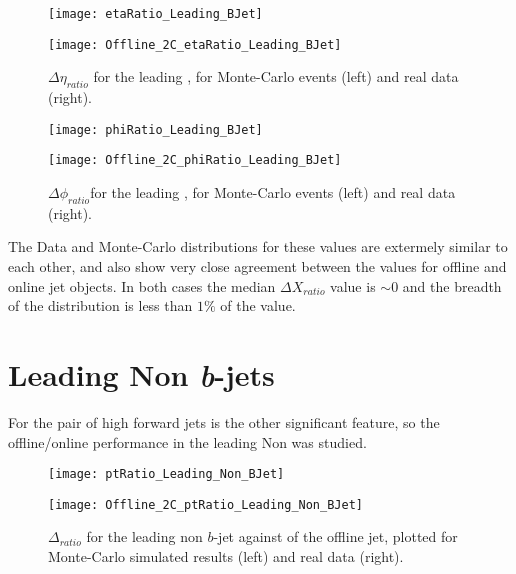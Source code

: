 		\begin{figure}[h]
			\centering
			\begin{minipage}[h]{0.33\linewidth}
				\texttt{[image: etaRatio\_Leading\_BJet]}
				
			\end{minipage}
			\quad
			\begin{minipage}[h]{0.33\linewidth}
				\texttt{[image: Offline\_2C\_etaRatio\_Leading\_BJet]}
			\end{minipage}
			\caption{$\Delta \eta_{ratio}$ for the leading \bjet, for Monte-Carlo events (left) and real data (right).}
			\label{fig:O:leadingbeta}
		\end{figure}
		
		\begin{figure}[h]
			\centering
			\begin{minipage}[h]{0.33\linewidth}
				\texttt{[image: phiRatio\_Leading\_BJet]}
				
			\end{minipage}
			\quad
			\begin{minipage}[h]{0.33\linewidth}
				\texttt{[image: Offline\_2C\_phiRatio\_Leading\_BJet]}
			\end{minipage}
			\caption{$\Delta \phi_{ratio}$for the leading \bjet, for Monte-Carlo events (left) and real data (right).}
			\label{fig:O:leadingbphi}
		\end{figure}
		
		The Data and Monte-Carlo distributions for these values are extermely similar to each other, and also show very close agreement between the values for offline and online jet objects. In both cases the median $\Delta X_{ratio}$ value is $\sim0$ and the breadth of the distribution is less than $1\%$ of the value. 
		

\newpage
\section{Leading Non \textit{b}-jets}
	\label{OP:leadingnonb}
	
	For \VBFHBB the pair of high \pt forward jets is the other significant feature, so the offline/online performance in the leading Non \bjet was studied.
	
	
	\begin{figure}[h]
		\centering
		\begin{minipage}[h]{0.33\linewidth}
			\texttt{[image: ptRatio\_Leading\_Non\_BJet]}
			
		\end{minipage}
		\quad
		\begin{minipage}[h]{0.33\linewidth}
			\texttt{[image: Offline\_2C\_ptRatio\_Leading\_Non\_BJet]}
		\end{minipage}
		\caption{$\Delta $\pt$_{ratio}$ for the leading \pt non $b$-jet against \pt of the offline jet, plotted for Monte-Carlo simulated results (left) and real data (right).}
		\label{fig:O:leadingnonbpt}
	\end{figure}
	
